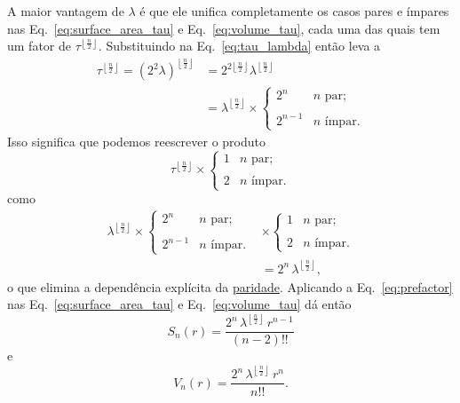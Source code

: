 A maior vantagem de $\lambda$ é que ele unifica completamente os casos pares e ímpares nas Eq.~\eqref{eq:surface_area_tau} e Eq.~\eqref{eq:volume_tau}, cada uma das quais tem um fator de $\tau^{\left\lfloor \frac{n}{2} \right\rfloor}$. Substituindo na Eq.~\eqref{eq:tau_lambda} então leva a
\[
\begin{split}
\tau^{\left\lfloor \frac{n}{2} \right\rfloor} = (2^2\lambda)^{\left\lfloor \frac{n}{2} \right\rfloor} & = 2^{2\left\lfloor \frac{n}{2} \right\rfloor} \lambda^{\left\lfloor \frac{n}{2} \right\rfloor} \\
& = \lambda^{\left\lfloor \frac{n}{2} \right\rfloor}\times
\begin{cases}
 2^n & n \text{ par}; \\ \\
 2^{n-1} & n \text{ ímpar}.
 \end{cases}
 \end{split}
\]
Isso significa que podemos reescrever o produto
\[
\tau^{\left\lfloor \frac{n}{2} \right\rfloor}\times \begin{cases}
1 & n \text{ par}; \\ \\
2 & n \text{ ímpar}.
\end{cases}
\]
como
\begin{equation}
\label{eq:prefactor}
\begin{split}
\lambda^{\left\lfloor \frac{n}{2} \right\rfloor} \times
\begin{cases}
 2^n & n \text{ par}; \\ \\
 2^{n-1} & n \text{ ímpar}.
 \end{cases}
 & \times
\begin{cases}
 1 & n \text{ par}; \\ \\
 2 & n \text{ ímpar}.
 \end{cases}
\\ & = 2^n\,\lambda^{\left\lfloor \frac{n}{2} \right\rfloor},
\end{split}
\end{equation}
o que elimina a dependência explícita da \href{https://pt.wikipedia.org/wiki/N%C3%BAmeros_pares_e_%C3%ADmpares}{paridade}. Aplicando a Eq.~\eqref{eq:prefactor} nas \linebreak Eq.~\eqref{eq:surface_area_tau} e Eq.~\eqref{eq:volume_tau} dá então
\begin{equation}
\label{eq:surface_area_lambda}
S_n(r) = \frac{2^n\,\lambda^{\left\lfloor \frac{n}{2} \right\rfloor}\,r^{n-1}}{(n-2)!!}
\end{equation}
e
\begin{equation}
\label{eq:volume_lambda}
V_n(r) = \frac{2^n\,\lambda^{\left\lfloor \frac{n}{2} \right\rfloor}\,r^n}{n!!}.
\end{equation}

